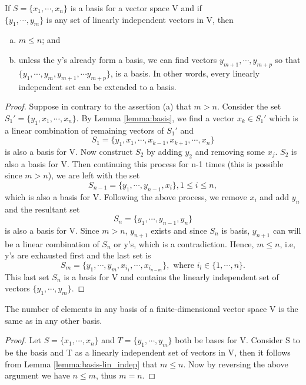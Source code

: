\documentclass[10pt,a4paper]{article}
\begin{document}
\begin{lemma}\label{lemma:basis-lin_indep}
    If $S = \{x_1,\cdots,x_n\}$ is a basis for a vector space V and if \\$\{y_1,\cdots, y_m\}$ is any set of linearly independent vectors in V, then \begin{enumerate}[(a)]
        \item $m\le n$; and
        \item unless the y's already form a basis, we can find vectors $y_{m+1}, \cdots, y_{m+p}$ so that $\{y_1,\cdots,y_m,y_{m+1},\cdots y_{m+p}\}$, is a basis. In other words, every linearly independent set can be extended to a basis.
    \end{enumerate} 
\end{lemma}

\begin{proof}
    Suppose in contrary to the assertion (a) that $m>n$. Consider the set $S_1' = \{y_1,x_1,\cdots,x_n\}$. By Lemma \ref{lemma:basis}, we find a vector $x_k\in S_1'$ which is a linear combination of remaining vectors of $S_1'$ and 
    $$
        S_1 = \{y_1,x_1,\cdots,x_{k-1},x_{k+1},\cdots,x_n\}
    $$
    is also a basis for V. Now construct $S_2$ by adding $y_2$ and removing some $x_j$. $S_2$ is also a basis for V. Then continuing this process for n-1 times (this is possible since $m>n$), we are left with the set 
    $$
        S_{n-1} = \{y_1,\cdots,y_{n-1},x_{i}\},1\le i\le n,
    $$
    which is also a basis for V. Following the above process, we remove $x_i$ and add $y_n$ and the resultant set 
    $$
        S_{n} = \{y_1,\cdots,y_{n-1},y_n\}
    $$
    is also a basis for V. Since $m>n$, $y_{n+1}$ exists and since $S_n$ is basis, $y_{n+1}$ can will be a linear combination of $S_n$ or y's, which is a contradiction. Hence, $m\le n$, i.e, y's are exhausted first and the last set is 
    $$
        S_{m} = \{y_1,\cdots,y_m,x_{i_1},\cdots,x_{i_{n-m}}\},\text{ where }i_l\in\{1,\cdots,n\}.
    $$
    This last set $S_n$ is a basis for V and contains the linearly independent set of vectors $\{y_1,\cdots,y_m\}$.
\end{proof}


\begin{theorem}\label{thm:dimension}
    The number of elements in any basis of a finite-dimensional vector space V is the same as in any other basis.
\end{theorem}

\begin{proof}
    Let $S = \{x_1,\cdots,x_n\}$ and $T = \{y_1,\cdots,y_m\}$ both be bases for V. Consider S to be the basis and T as a linearly independent set of vectors in V, then it follows from Lemma \ref{lemma:basis-lin_indep} that $m\le n$. Now by reversing the above argument we have $n\le m$, thus $m=n$.
\end{proof}
\end{document}
